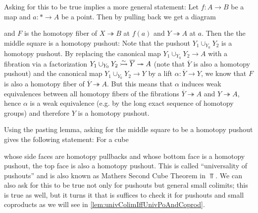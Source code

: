 Asking for this to be true implies a more general statement:
Let $f\colon A\to B$ be a map and $a\colon *\to A$ be a point.
Then by pulling back we get a diagram 
\begin{center}
\end{center}
and $F$ is the homotopy fiber of $X\twoheadrightarrow B$ at $f(a)$ and $Y\twoheadrightarrow A$ at $a$.
Then the the middle square is a homotopy pushout:
Note that the pushout $Y_1\cup_{Y_0}Y_2$ is a homotopy pushout. 
By replacing the canonical map $Y_1\cup_{Y_0}Y_2\to A$ with a fibration via a factorization $Y_1\cup_{Y_0}Y_2\xtailrightarrow{\sim}\overline{Y}\twoheadrightarrow A$ (note that $\overline{Y}$ is also a homotopy pushout) and the canonical map $Y_1\cup_{Y_0}Y_2\to Y$ by a lift $\alpha\colon\overline{Y}\to Y$, we know that $F$ is also a homotopy fiber of $\overline{Y}\twoheadrightarrow A$.
But this means that $\alpha$ induces weak equivalences between all homotopy fibers of the fibrations $\overline{Y}\twoheadrightarrow A$ and $Y\twoheadrightarrow A$, hence $\alpha$ is a weak equivalence (e.g. by the long exact sequence of homotopy groups) and therefore $Y$ is a homotopy pushout.

Using the pasting lemma, asking for the middle square to be a homotopy pushout gives the following statement: 
For a cube 
\begin{center}
\end{center}
whose side faces are homotopy pullbacks and whose bottom face is a homotopy pushout, the top face is also a homotopy pushout.
This is called  ``universality of pushouts'' and is also known as Mathers Second Cube Theorem in $\Top$.
We can also ask for this to be true not only for pushouts but general small colimits; this is true as well, but it turns it that is suffices to check it for pushouts and small coproducts as we will see in \cref{lem:univColimIffUnivPoAndCoprod}.

